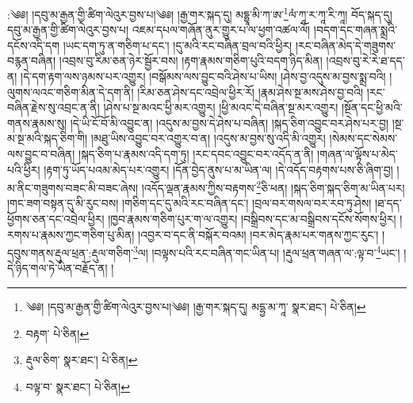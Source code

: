 \setcounter{footnote}{0} 
:༄༅། །དབུ་མ་རྒྱན་གྱི་ཚིག་ལེའུར་བྱས་པ།༄༅། །རྒྱ་གར་སྐད་དུ། མདྷྱཱ་མི་ཀ་ཨ་\footnote{༄༅། །དབུ་མ་རྒྱན་གྱི་ཚིག་ལེའུར་བྱས་པ།༄༅། །རྒྱ་གར་སྐད་དུ། མདྷྱ་མ་ཀཱ་  སྣར་ཐང་།  པེ་ཅིན། }ལཾ་ཀཱ་ར་ཀཱ་རི་ཀཱ། བོད་སྐད་དུ། དབུ་མ་རྒྱན་གྱི་ཚིག་ལེའུར་བྱས་པ། འཇམ་དཔལ་གཞོན་ནུར་གྱུར་པ་ལ་ཕྱག་འཚལ་ལོ། །བདག་དང་གཞན་སྨྲའི་དངོས་འདི་དག །ཡང་དག་ཏུ་ན་གཅིག་པ་དང་། །དུ་མའི་རང་བཞིན་བྲལ་བའི་ཕྱིར། །རང་བཞིན་མེད་དེ་གཟུགས་བརྙན་བཞིན། །འབྲས་བུ་རིམ་ཅན་ཉེར་སྦྱོར་བས། །རྟག་རྣམས་གཅིག་པུའི་བདག་ཉིད་མིན། །འབྲས་བུ་རེ་རེ་ཐ་དད་ན། །དེ་དག་རྟག་ལས་ཉམས་པར་འགྱུར། །བསྒོམས་ལས་བྱུང་བའི་ཤེས་པ་ཡིས། །ཤེས་བྱ་འདུས་མ་བྱས་སྨྲ་བའི། །ལུགས་ལའང་གཅིག་མིན་དེ་དག་ནི། །རིམ་ཅན་ཤེས་དང་འབྲེལ་ཕྱིར་རོ། །རྣམ་ཤེས་སྔ་མས་ཤེས་བྱ་བའི། །རང་བཞིན་རྗེས་སུ་འབྲང་ན་ནི། །ཤེས་པ་སྔ་མའང་ཕྱི་མར་འགྱུར། །ཕྱི་མའང་དེ་བཞིན་སྔ་མར་འགྱུར། །སྔོན་དང་ཕྱི་མའི་གནས་རྣམས་སུ། །དེ་ཡི་ངོ་བོ་མི་འབྱུང་ན། །འདུས་མ་བྱས་དེ་ཤེས་པ་བཞིན། །སྐད་ཅིག་འབྱུང་བར་ཤེས་པར་བྱ། །སྔ་མ་སྔ་མའི་སྐད་ཅིག་གི། །མཐུ་ཡིས་འབྱུང་བར་འགྱུར་བ་ན། །འདུས་མ་བྱས་སུ་འདི་མི་འགྱུར། །སེམས་དང་སེམས་ལས་བྱུང་བ་བཞིན། །སྐད་ཅིག་པ་རྣམས་འདི་དག་ཏུ། །རང་དབང་འབྱུང་བར་འདོད་ན་ནི། །གཞན་ལ་ལྟོས་པ་མེད་པའི་ཕྱིར། །རྟག་ཏུ་ཡོད་པའམ་མེད་པར་འགྱུར། །དོན་བྱེད་ནུས་པ་མ་ཡིན་ལ། །དེ་འདོད་བརྟགས་པས་ཅི་ཞིག་བྱ། །མ་ནིང་གཟུགས་བཟང་མི་བཟང་ཞེས། །འདོད་ལྡན་རྣམས་ཀྱིས་བརྟགས་\footnote{བརྟག་  པེ་ཅིན། }ཅི་ཕན། །སྐད་ཅིག་སྐད་ཅིག་མ་ཡིན་པར། །གང་ཟག་བསྟན་དུ་མི་རུང་བས། །གཅིག་དང་དུ་མའི་རང་བཞིན་དང་། །བྲལ་བར་གསལ་བར་རབ་ཏུ་ཤེས། །ཐ་དད་ཕྱོགས་ཅན་དང་འབྲེལ་ཕྱིར། །ཁྱབ་རྣམས་གཅིག་པུར་ག་ལ་འགྱུར། །བསྒྲིབས་དང་མ་བསྒྲིབས་དངོས་སོགས་ཕྱིར། །རགས་པ་རྣམས་ཀྱང་གཅིག་པུ་མིན། །འབྱར་བ་དང་ནི་བསྐོར་བའམ། །བར་མེད་རྣམ་པར་གནས་ཀྱང་རུང་། །དབུས་གནས་རྡུལ་ཕྲན་:རྡུལ་གཅིག་\footnote{རྡུལ་ཅིག་  སྣར་ཐང་།  པེ་ཅིན། }ལ། །བལྟས་པའི་རང་བཞིན་གང་ཡིན་པ། །རྡུལ་ཕྲན་གཞན་ལ་:ལྟ་བ་\footnote{བལྟ་བ་  སྣར་ཐང་།  པེ་ཅིན། }ཡང་། །དེ་ཉིད་གལ་ཏེ་ཡིན་བརྗོད་ན། །
